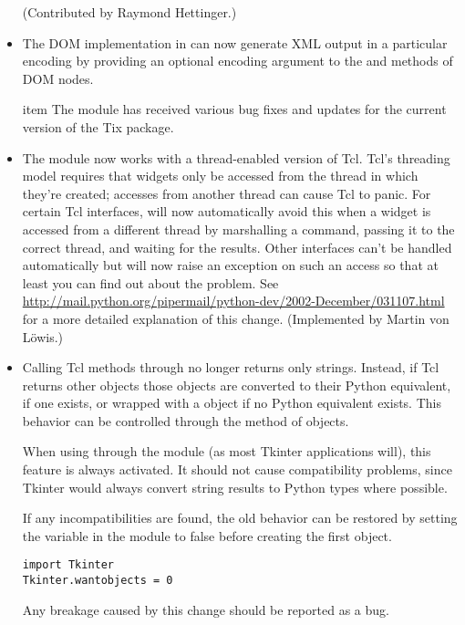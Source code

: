 \documentclass{howto}
\begin{document}
\begin{itemize}
(Contributed by Raymond Hettinger.)

\item The DOM implementation
in  can now generate XML output in a
particular encoding by providing an optional encoding argument to
the  and  methods of DOM nodes.

item The  module has received various bug fixes and
updates for the current version of the Tix package.

\item The  module now works with a thread-enabled 
version of Tcl.  Tcl's threading model requires that widgets only be
accessed from the thread in which they're created; accesses from
another thread can cause Tcl to panic.  For certain Tcl interfaces,
 will now automatically avoid this 
when a widget is accessed from a different thread by marshalling a
command, passing it to the correct thread, and waiting for the
results.  Other interfaces can't be handled automatically but
 will now raise an exception on such an access so that
at least you can find out about the problem.  See
\url{http://mail.python.org/pipermail/python-dev/2002-December/031107.html}
for a more detailed explanation of this change.  (Implemented by
Martin von L\"owis.)

\item Calling Tcl methods through  no longer 
returns only strings. Instead, if Tcl returns other objects those
objects are converted to their Python equivalent, if one exists, or
wrapped with a  object if no Python equivalent
exists. This behavior can be controlled through the
 method of  objects.

When using  through the  module (as
most Tkinter applications will), this feature is always activated. It
should not cause compatibility problems, since Tkinter would always
convert string results to Python types where possible.

If any incompatibilities are found, the old behavior can be restored
by setting the  variable in the 
module to false before creating the first  object.

\begin{verbatim}
import Tkinter
Tkinter.wantobjects = 0
\end{verbatim}

Any breakage caused by this change should be reported as a bug.

\end{itemize}
\end{document}
